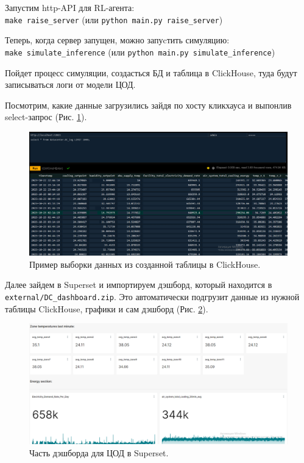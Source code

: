 \documentclass{article}
\begin{document}
Запустим http-API для RL-агента:\\
\Verb+make raise_server+ (или \Verb+python main.py raise_server+)

Теперь, когда сервер запущен, можно запуcтить симуляцию:\\ 
\Verb+make simulate_inference+ (или \Verb+python main.py simulate_inference+)

Пойдет процесс симуляции, создасться БД и таблица в ClickHouse, туда будут записываться логи от модели ЦОД.

Посмотрим, какие данные загрузились зайдя по хосту кликхауса и выпонлив select-запрос (Рис. \ref{fig:CH-select}).

\begin{figure}[h]

\centering

\includegraphics[width=0.95\linewidth]{figures/clickhouse_select.png}

\caption{Пример выборки данных из созданной таблицы в ClickHouse.}

\label{fig:CH-select}

\end{figure}
Далее зайдем в Superset и импортируем дэшборд, который находится в \Verb+external/DC_dashboard.zip+. Это автоматически подгрузит данные из нужной таблицы ClickHouse, графики и сам дэшборд (Рис. \ref{fig:superset-dashboard}).

\begin{figure}[h]

\centering

\includegraphics[width=0.95\linewidth]{figures/Superset_dashboard.png}

\caption{Часть дэшборда для ЦОД в Superset.}

\label{fig:superset-dashboard}

\end{figure}
\end{document}
